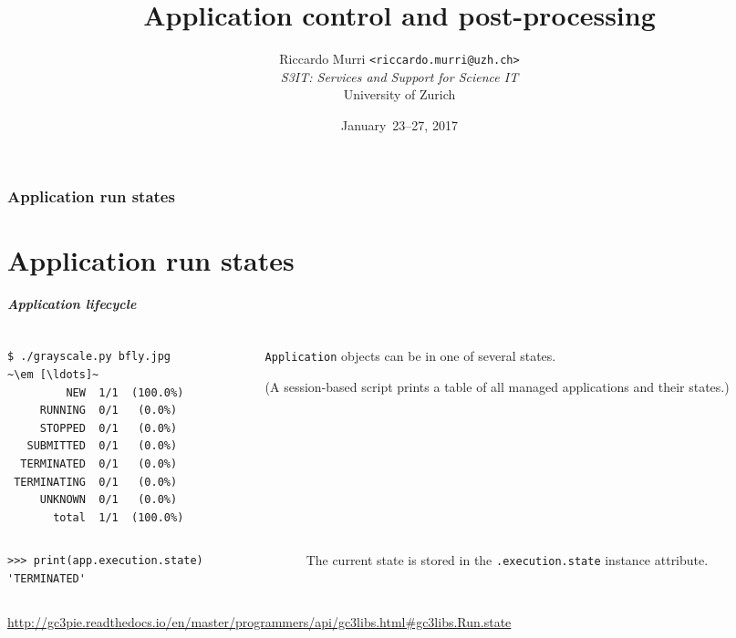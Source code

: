 \documentclass[english,serif,mathserif,xcolor=pdftex,dvipsnames,table]{beamer}
\title[Post-processing]{%
  Application control and post-processing
}
\author[R. Murri, S3IT UZH]{%
  Riccardo Murri \texttt{<riccardo.murri@uzh.ch>}
  \\[1ex]
  \emph{S3IT: Services and Support for Science IT}
  \\[1ex]
  University of Zurich
}
\date{January~23--27, 2017}
\begin{document}
\maketitle


\section{Application run states}
\part{Application run states}

\begin{frame}[fragile]
\frametitle{Application lifecycle}

\begin{columns}[c]
  \begin{column}{0.5\textwidth}
\begin{lstlisting}[basicstyle=\footnotesize\ttfamily,keywordstyle=\normalfont]
$ ./grayscale.py bfly.jpg
~\em [\ldots]~
         NEW  1/1  (100.0%)
     RUNNING  0/1   (0.0%)
     STOPPED  0/1   (0.0%)
   SUBMITTED  0/1   (0.0%)
  TERMINATED  0/1   (0.0%)
 TERMINATING  0/1   (0.0%)
     UNKNOWN  0/1   (0.0%)
       total  1/1  (100.0%)
\end{lstlisting}%
  \end{column}
  \begin{column}{0.5\textwidth}
    \raggedleft
    \texttt{Application} objects can be in one of several states.

    \+
    (A session-based script prints a table of all managed applications and their states.)
  \end{column}
\end{columns}

\+
\begin{columns}[c]
  \begin{column}{0.5\textwidth}
\begin{lstlisting}[basicstyle=\footnotesize\ttfamily]
>>> print(app.execution.state)
'TERMINATED'
\end{lstlisting}
  \end{column}
  \begin{column}{0.5\textwidth}
    \raggedleft
    The current state is stored in the \texttt{.execution.state} instance attribute.
  \end{column}
\end{columns}

\+
\begin{references}
  \tiny
  \url{http://gc3pie.readthedocs.io/en/master/programmers/api/gc3libs.html#gc3libs.Run.state}
\end{references}
\end{frame}
\end{document}
